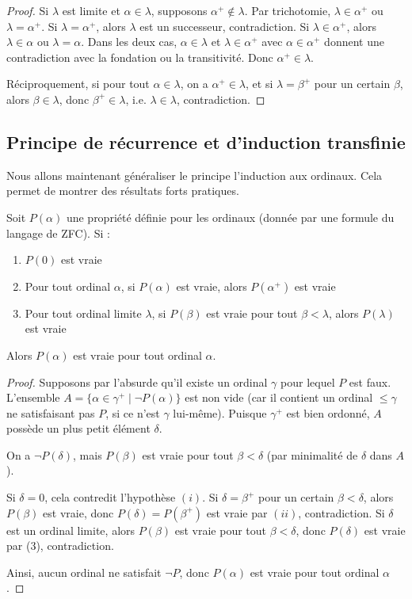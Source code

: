 \begin{proof}
	Si $\lambda$ est limite et $\alpha \in \lambda$, supposons $\alpha^+ \notin \lambda$. Par trichotomie, $\lambda \in \alpha^+$ ou $\lambda = \alpha^+$. Si $\lambda = \alpha^+$, alors $\lambda$ est un successeur, contradiction. Si $\lambda \in \alpha^+$, alors $\lambda \in \alpha$ ou $\lambda = \alpha$. Dans les deux cas, $\alpha \in \lambda$ et $\lambda \in \alpha^+$ avec $\alpha \in \alpha^+$ donnent une contradiction avec la fondation ou la transitivité. Donc $\alpha^+ \in \lambda$.

	Réciproquement, si pour tout $\alpha \in \lambda$, on a $\alpha^+ \in \lambda$, et si $\lambda = \beta^+$ pour un certain $\beta$, alors $\beta \in \lambda$, donc $\beta^+ \in \lambda$, i.e. $\lambda \in \lambda$, contradiction.
\end{proof}



\subsection{Principe de récurrence et d'induction transfinie}

Nous allons maintenant généraliser le principe l'induction aux ordinaux. Cela permet de montrer des résultats forts pratiques.

\begin{theoreme}\label{thm:recurrence_transfinie}
	Soit $P(\alpha)$ une propriété définie pour les ordinaux (donnée par une formule du langage de ZFC). Si :
	\begin{enumerate}
		\item $P(0)$ est vraie
		\item Pour tout ordinal $\alpha$, si $P(\alpha)$ est vraie, alors $P(\alpha^+)$ est vraie
		\item Pour tout ordinal limite $\lambda$, si $P(\beta)$ est vraie pour tout $\beta < \lambda$, alors $P(\lambda)$ est vraie
	\end{enumerate}
	Alors $P(\alpha)$ est vraie pour tout ordinal $\alpha$.
\end{theoreme}
\begin{proof}
	Supposons par l'absurde qu'il existe un ordinal $\gamma$ pour lequel $P$ est faux. L'ensemble $A = \{\alpha \in \gamma^+ \mid \neg P(\alpha)\}$ est non vide (car il contient un ordinal $\leqslant \gamma$ ne satisfaisant pas $P$, si ce n'est $\gamma$ lui-même). Puisque $\gamma^+$ est bien ordonné, $A$ possède un plus petit élément $\delta$.

	On a $\neg P(\delta)$, mais $P(\beta)$ est vraie pour tout $\beta < \delta$ (par minimalité de $\delta$ dans $A$).

	Si $\delta = 0$, cela contredit l'hypothèse $(i)$.
	Si $\delta = \beta^+$ pour un certain $\beta < \delta$, alors $P(\beta)$ est vraie, donc $P(\delta) = P(\beta^+)$ est vraie par $(ii)$, contradiction.
	Si $\delta$ est un ordinal limite, alors $P(\beta)$ est vraie pour tout $\beta < \delta$, donc $P(\delta)$ est vraie par (3), contradiction.

	Ainsi, aucun ordinal ne satisfait $\neg P$, donc $P(\alpha)$ est vraie pour tout ordinal $\alpha$.
\end{proof}

